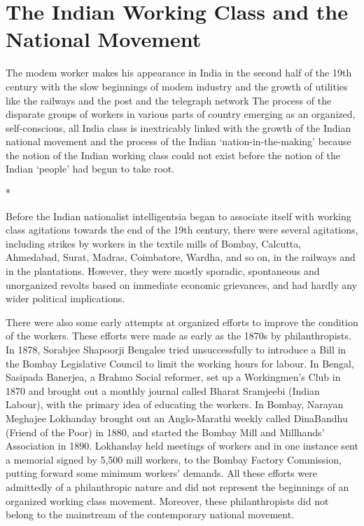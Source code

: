 \chapter[The Indian Working Class and National Movement]{The Indian Working Class and the National Movement}



The modem worker makes his appearance in India in the second half of the 19th century with the slow beginnings of modem industry and the growth of utilities like the railways and the post and the telegraph network The process of the disparate groups of workers in various parts of country emerging as an organized, self-conscious, all India class is inextricably linked with the growth of the Indian national movement and the process of the Indian ‘nation-in-the-making’ because the notion of the Indian working class could not exist before the notion of the Indian ‘people’ had begun to take root.

\begin{center}*\end{center}



Before the Indian nationalist intelligentsia began to associate itself with working class agitations towards the end of the 19th century, there were several agitations, including strikes by workers in the textile mills of Bombay, Calcutta, Ahmedabad, Surat, Madras, Coimbatore, Wardha, and so on, in the railways and in the plantations. However, they were mostly sporadic, spontaneous and unorganized revolts based on immediate economic grievances, and had hardly any wider political implications.

There were also some early attempts at organized efforts to improve the condition of the workers. These efforts were made as early as the 1870s by philanthropists. In 1878, Sorabjee Shapoorji Bengalee tried unsuccessfully to introduce a Bill in the Bombay Legislative Council to limit the working hours for labour. In Bengal, Sasipada Banerjea, a Brahmo Social reformer, set up a Workingmen’s Club in 1870 and brought out a monthly journal called Bharat Sramjeebi (Indian Labour), with the primary idea of educating the workers. In Bombay, Narayan Meghajee Lokhanday brought out an Anglo-Marathi weekly called DinaBandhu (Friend of the Poor) in 1880, and started the Bombay Mill and Millhands’ Association in 1890. Lokhanday held meetings of workers and in one instance sent a memorial signed by 5,500 mill workers, to the Bombay Factory Commission, putting forward some minimum workers’ demands. All these efforts were admittedly of a philanthropic nature and did not represent the beginnings of an organized working class movement. Moreover, these philanthropists did not belong to the mainstream of the contemporary national movement.

